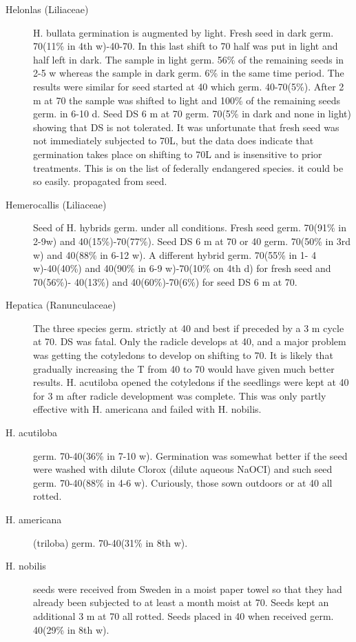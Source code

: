 \begin{description}
\item[Helonlas (Liliaceae)] H. bullata germination is augmented by light. Fresh
seed in dark germ. 70(11\% in 4th w)-40-70. In this last shift to 70 half was put in light
and half left in dark. The sample in light germ. 56\% of the remaining seeds in 2-5 w
whereas the sample in dark germ. 6\% in the same time period. The results were
similar for seed started at 40 which germ. 40-70(5\%). After 2 m at 70 the sample was
shifted to light and 100\% of the remaining seeds germ. in 6-10 d. Seed DS 6 m at 70
germ. 70(5\% in dark and none in light) showing that DS is not tolerated. It was
unfortunate that fresh seed was not immediately subjected to 70L, but the data does
indicate that germination takes place on shifting to 70L and is insensitive to prior
treatments. This is on the list of federally endangered species. it could be so easily.
propagated from seed.

\item[Hemerocallis (Liliaceae)] Seed of H. hybrids germ. under all conditions.
Fresh seed germ. 70(91\% in 2-9w) and 40(15\%)-70(77\%). Seed DS 6 m at 70 or 40
germ. 70(50\% in 3rd w) and 40(88\% in 6-12 w). A different hybrid germ. 70(55\% in 1-
4 w)-40(40\%) and 40(90\% in 6-9 w)-70(10\% on 4th d) for fresh seed and 70(56\%)-
40(13\%) and 40(60\%)-70(6\%) for seed DS 6 m at 70.

\item[Hepatica (Ranunculaceae)] The three species germ. strictly at 40 and best
if preceded by a 3 m cycle at 70. DS was fatal. Only the radicle develops at 40, and a
major problem was getting the cotyledons to develop on shifting to 70. It is likely that
gradually increasing the T from 40 to 70 would have given much better results. H.
acutiloba opened the cotyledons if the seedlings were kept at 40 for 3 m after radicle
development was complete. This was only partly effective with H. americana and
failed with H. nobilis.

\item[H. acutiloba] germ. 70-40(36\% in 7-10 w). Germination was somewhat better if
the seed were washed with dilute Clorox (dilute aqueous NaOCI) and such seed
germ. 70-40(88\% in 4-6 w). Curiously, those sown outdoors or at 40 all rotted.
\item[H. americana] (triloba) germ. 70-40(31\% in 8th w).
\item[H. nobilis] seeds were received from Sweden in a moist paper towel so that they
had already been subjected to at least a month moist at 70. Seeds kept an additional
3 m at 70 all rotted. Seeds placed in 40 when received germ. 40(29\% in 8th w).


\end{description}
